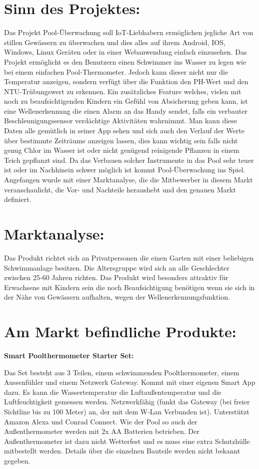 \section{Sinn des Projektes:}
Das Projekt Pool-Überwachung soll IoT-Liebhabern ermöglichen jegliche Art von stillen Gewässern zu überwachen und dies alles auf ihrem Android, IOS, Windows, Linux Geräten oder in einer Webanwendung einfach einzusehen. 
Das Projekt ermöglicht es den Benutzern einen Schwimmer ins Wasser zu legen wie bei einem einfachen Pool-Thermometer. 
Jedoch kann dieser nicht nur die Temperatur anzeigen, sondern verfügt über die Funktion den PH-Wert und den NTU-Trübungswert zu erkennen. Ein zusätzliches Feature welches, vielen mit noch zu beaufsichtigenden Kindern ein Gefühl von Absicherung geben kann, ist eine Wellenerkennung die einen Alarm an das Handy sendet, falls ein verbauter Beschleunigungssensor verdächtige Aktivitäten wahrnimmt. 
Man kann diese Daten alle gemütlich in seiner App sehen und sich auch den Verlauf der Werte über bestimmte Zeiträume anzeigen lassen, dies kann wichtig sein falls nicht genug Chlor im Wasser ist oder nicht genügend reinigende Pflanzen in einem Teich gepflanzt sind. Da das Verbauen solcher Instrumente in das Pool sehr teuer ist oder im Nachhinein schwer möglich ist kommt Pool-Überwachung ins Spiel. 
\newline
Angefangen wurde mit einer Marktanalyse, die die Mitbewerber in diesem Markt veranschaulicht, die Vor- und Nachteile heraushebt und den genauen Markt definiert.

\section{Marktanalyse:}
Das Produkt richtet sich an Privatpersonen 
die einen Garten mit einer beliebigen Schwimmanlage besitzen. 
Die Altersgruppe wird sich an alle Geschlechter zwischen 25-60 Jahren richten. 
Das Produkt wird besonders attraktiv für Erwachsene 
mit Kindern sein die noch Beaufsichtigung benötigen wenn sie sich
in der Nähe von Gewässern aufhalten, wegen der Wellenerkennungsfunktion.
\section{Am Markt befindliche Produkte:}
\textbf{Smart Poolthermometer Starter Set:}


Das Set besteht aus 3 Teilen, einem schwimmenden Poolthermometer, 
einem Aussenfühler und einem Netzwerk Gateway. Kommt mit einer eigenen Smart App dazu. 
Es kann die Wassertemperatur die Luftaußentemperatur und die Luftfeuchtigkeit gemessen werden.
Netzwerkfähig (funkt das Gateway (bei freier Sichtline bis zu 100 Meter) an, 
der mit dem W-Lan Verbunden ist). Unterstützt Amazon Alexa und Conrad Connect. 
Wie der Pool so auch der Außenthermometer werden mit 2x AA Batterien betrieben. 
Der Außenthermometer ist dazu nicht Wetterfest und es muss eine extra Schutzhülle 
mitbestellt werden. Details über die einzelnen Bauteile werden nicht bekannt gegeben.



